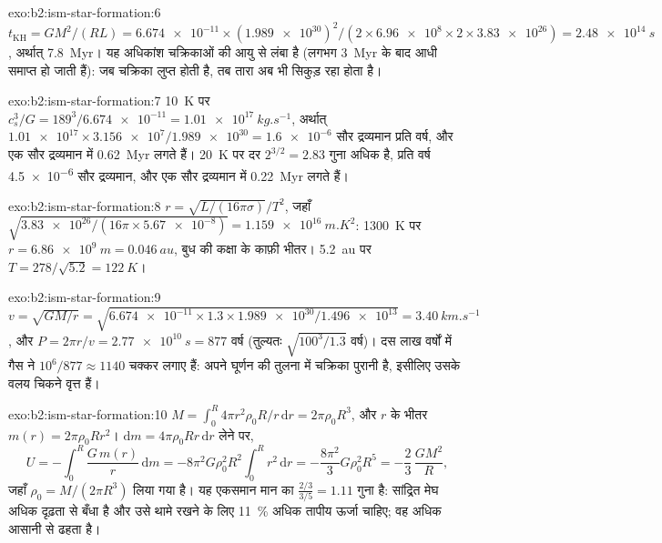 \begin{solution}{exo:b2:ism-star-formation:6}
$t_{\mathrm{KH}} = GM^2/(RL) = \num{6.674e-11}\times(\num{1.989e30})^2/(2\times
\num{6.96e8}\times2\times\num{3.83e26}) = \qty{2.48e14}{s}$, अर्थात्
\qty{7.8}{Myr}। यह अधिकांश चक्रिकाओं की आयु से लंबा है (लगभग \qty{3}{Myr} के बाद
आधी समाप्त हो जाती हैं): जब चक्रिका लुप्त होती है, तब तारा अब भी सिकुड़ रहा होता है।
\end{solution}

\begin{solution}{exo:b2:ism-star-formation:7}
\qty{10}{K} पर $c_s^3/G = 189^3/\num{6.674e-11} = \qty{1.01e17}{kg.s^{-1}}$, अर्थात्
$\num{1.01e17}\times\num{3.156e7}/\num{1.989e30} = \num{1.6e-6}$ सौर द्रव्यमान प्रति
वर्ष, और एक सौर द्रव्यमान में \qty{0.62}{Myr} लगते हैं। \qty{20}{K} पर दर
$2^{3/2} = 2.83$ गुना अधिक है, प्रति वर्ष \num{4.5e-6} सौर द्रव्यमान, और एक सौर
द्रव्यमान में \qty{0.22}{Myr} लगते हैं।
\end{solution}

\begin{solution}{exo:b2:ism-star-formation:8}
$r = \sqrt{L/(16\pi\sigma)}/T^2$, जहाँ $\sqrt{\num{3.83e26}/(16\pi\times\num{5.67e-8})}
= \qty{1.159e16}{m.K^2}$: \qty{1300}{K} पर $r = \qty{6.86e9}{m} = \qty{0.046}{au}$,
बुध की कक्षा के काफ़ी भीतर। \qty{5.2}{au} पर $T = 278/\sqrt{5.2} = \qty{122}{K}$।
\end{solution}

\begin{solution}{exo:b2:ism-star-formation:9}
$v = \sqrt{GM/r} = \sqrt{\num{6.674e-11}\times1.3\times\num{1.989e30}/\num{1.496e13}}
= \qty{3.40}{km.s^{-1}}$, और $P = 2\pi r/v = \qty{2.77e10}{s} = 877$ वर्ष
(तुल्यतः $\sqrt{100^3/1.3}$ वर्ष)। दस लाख वर्षों में गैस ने
$10^6/877 \approx \num{1140}$ चक्कर लगाए हैं: अपने घूर्णन की तुलना में चक्रिका पुरानी है,
इसीलिए उसके वलय चिकने वृत्त हैं।
\end{solution}

\begin{solution}{exo:b2:ism-star-formation:10}
$M = \int_0^R 4\pi r^2\rho_0R/r\,\mathrm dr = 2\pi\rho_0R^3$, और $r$ के भीतर
$m(r) = 2\pi\rho_0Rr^2$। $\mathrm dm = 4\pi\rho_0Rr\,\mathrm dr$ लेने पर,
\[
  U = -\int_0^R \frac{G\,m(r)}{r}\,\mathrm dm
    = -8\pi^2G\rho_0^2R^2\int_0^R r^2\,\mathrm dr = -\frac{8\pi^2}{3}G\rho_0^2R^5
    = -\frac23\,\frac{GM^2}{R},
\]
जहाँ $\rho_0 = M/(2\pi R^3)$ लिया गया है। यह एकसमान मान का $\tfrac{2/3}{3/5} = 1.11$ गुना है:
सांद्रित मेघ अधिक दृढ़ता से बँधा है और उसे थामे रखने के लिए \qty{11}{\percent} अधिक
तापीय ऊर्जा चाहिए; वह अधिक आसानी से ढहता है।
\end{solution}

